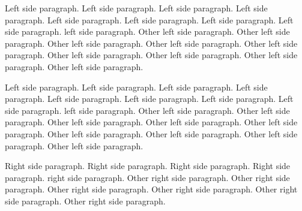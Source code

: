 \documentclass{article}
\begin{document}
        \beginnumbering
            \pstart
                Left side paragraph. Left side paragraph. Left side paragraph. Left side paragraph. Left side paragraph. Left side paragraph. Left side paragraph. Left side paragraph.
            \pend
            \pstart
                  left side paragraph.  Other left side paragraph.  Other left side paragraph.  Other left side paragraph.  Other left side paragraph.  Other left side paragraph.  Other left side paragraph.  Other left side paragraph.  Other left side paragraph.  Other left side paragraph.
            \pend
        \endnumbering


\begin{pages}
    \begin{Leftside}
        \beginnumbering
            \pstart
                Left side paragraph. Left side paragraph. Left side paragraph. Left side paragraph. Left side paragraph. Left side paragraph. Left side paragraph. Left side paragraph.
            \pend
            \pstart
                  left side paragraph.  Other left side paragraph.  Other left side paragraph.  Other left side paragraph.  Other left side paragraph.  Other left side paragraph.  Other left side paragraph.  Other left side paragraph.  Other left side paragraph.  Other left side paragraph.
            \pend
        \endnumbering
    \end{Leftside}
    \begin{Rightside}
        \beginnumbering
            \pstart
                Right side paragraph. Right side paragraph. Right side paragraph. Right side paragraph.
            \pend
            \pstart
                  right side paragraph. Other right side paragraph. Other right side paragraph. Other right side paragraph. Other right side paragraph. Other right side paragraph. Other right side paragraph.
            \pend
        \endnumbering
    \end{Rightside}

\end{pages} 
\Pages
\end{document}
